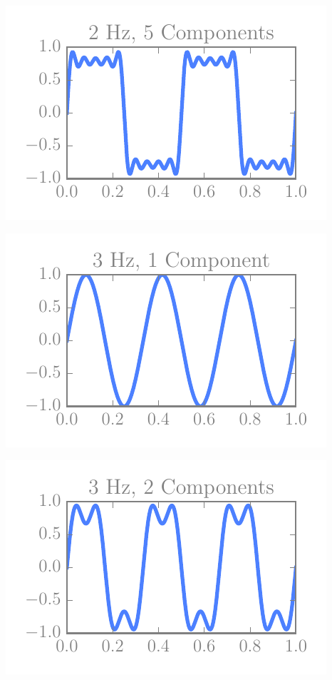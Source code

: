 \begin{multicols}{5}
\includegraphics[width=\linewidth]{../img/fouriers/2_5.pdf}

\includegraphics[width=\linewidth]{../img/fouriers/3_1.pdf}

\includegraphics[width=\linewidth]{../img/fouriers/3_2.pdf}


\end{multicols}
